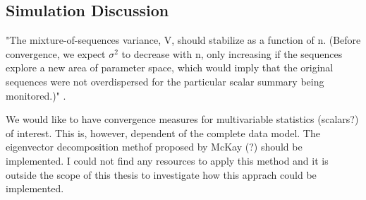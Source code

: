 \documentclass[article]{jss}
\begin{document}
\subsection{Simulation Discussion}

"The mixture-of-sequences variance, V, should stabilize as a function of n. (Before convergence, we expect $\sigma^2$ to decrease with n, only increasing if the sequences explore a new area of parameter space, which would imply that the original sequences were not overdispersed for the particular scalar summary being monitored.)" \cite[p~438]{broo98}.

We would like to have convergence measures for multivariable statistics (scalars?) of interest. This is, however, dependent of the complete data model. The eigenvector decomposition methof proposed by McKay (?) should be implemented. I could not find any resources to apply this method and it is outside the scope of this thesis to investigate how this apprach could be implemented.



% 


\end{document}
